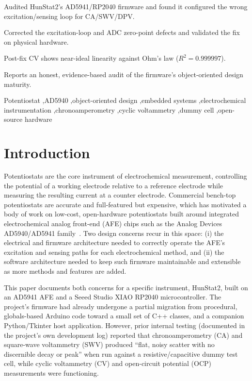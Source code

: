 \documentclass[preprint,12pt]{elsarticle}
\begin{document}
\begin{frontmatter}
\begin{graphicalabstract}
\end{graphicalabstract}

\begin{highlights}
\item Audited HunStat2's AD5941/RP2040 firmware and found it configured the wrong excitation/sensing loop for CA/SWV/DPV.
\item Corrected the excitation-loop and ADC zero-point defects and validated the fix on physical hardware.
\item Post-fix CV shows near-ideal linearity against Ohm's law ($R^2 = 0.999997$).
\item Reports an honest, evidence-based audit of the firmware's object-oriented design maturity.
\end{highlights}

\begin{keyword}
Potentiostat \sep AD5940 \sep object-oriented design \sep embedded systems \sep electrochemical instrumentation \sep chronoamperometry \sep cyclic voltammetry \sep dummy cell \sep open-source hardware
\end{keyword}

\end{frontmatter}


\section{Introduction}
Potentiostats are the core instrument of electrochemical measurement, controlling the potential of a working electrode relative to a reference electrode while measuring the resulting current at a counter electrode. Commercial bench-top potentiostats are accurate and full-featured but expensive, which has motivated a body of work on low-cost, open-hardware potentiostats built around integrated electrochemical analog front-end (AFE) chips such as the Analog Devices AD5940/AD5941 family~\cite{ref:ad5940datasheet}. Two design concerns recur in this space: (i) the electrical and firmware architecture needed to correctly operate the AFE's excitation and sensing paths for each electrochemical method, and (ii) the software architecture needed to keep such firmware maintainable and extensible as more methods and features are added.

This paper documents both concerns for a specific instrument, HunStat2, built on an AD5941 AFE and a Seeed Studio XIAO RP2040 microcontroller. The project's firmware had already undergone a partial migration from procedural, globals-based Arduino code toward a small set of C++ classes, and a companion Python/Tkinter host application. However, prior internal testing (documented in the project's own development log) reported that chronoamperometry (CA) and square-wave voltammetry (SWV) produced ``flat, noisy scatter with no discernible decay or peak'' when run against a resistive/capacitive dummy test cell, while cyclic voltammetry (CV) and open-circuit potential (OCP) measurements were functioning.
\end{document}
